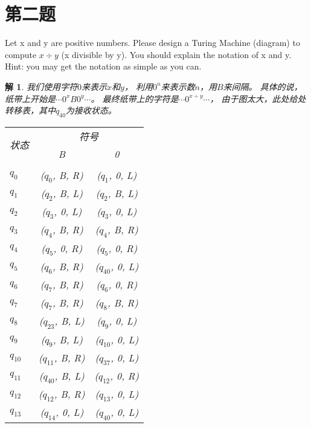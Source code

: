 \documentclass[12pt,onecolumn]{article}
\theoremstyle{plain}
\newtheorem*{solution}{解}
\begin{document}
\section{第二题}
Let x and y are positive numbers.
Please design a Turing Machine (diagram) to compute $x \div y$ (x divisible by y).
You should explain the notation of x and y.
Hint: you may get the notation as simple as you can.

\begin{solution}
 我们使用字符$0$来表示$x$和$y$，
 利用$0^n$来表示数$n$，用$B$来间隔。
 具体的说，
 纸带上开始是$\cdots 0^x B 0^y \cdots$。
 最终纸带上的字符是$\cdots 0^{x \div y} \cdots$，
 由于图太大，此处给处转移表，其中$q_{40}$为接收状态。
 \begin{table}[H]
 \vspace{0.5em}\centering\wuhao{}
 \begin{tabular}{l|cc}
 \multirow{2}{*}{状态}
 & \multicolumn{2}{c}{符号}                    \\
 ~        & B                        & 0                \\
 \toprule                                               \\
 $q_{0}$  & ($q_{0}$, B, R)          & ($q_{1}$, 0, L)  \\
 $q_{1}$  & ($q_{2}$, B, L)          & ($q_{2}$, B, L)  \\
 $q_{2}$  & ($q_{3}$, 0, L)          & ($q_{3}$, 0, L)  \\
 $q_{3}$  & ($q_{4}$, B, R)          & ($q_{4}$, B, R)  \\
 $q_{4}$  & ($q_{5}$, 0, R)          & ($q_{5}$, 0, R)  \\
 $q_{5}$  & ($q_{6}$, B, R)          & ($q_{40}$, 0, L) \\
 $q_{6}$  & ($q_{7}$, B, R)          & ($q_{6}$, 0, R)  \\
 $q_{7}$  & ($q_{7}$, B, R)          & ($q_{8}$, B, R)  \\
 $q_{8}$  & ($q_{23}$, B, L)         & ($q_{9}$, 0, L)  \\
 $q_{9}$  & ($q_{9}$, B, L)          & ($q_{10}$, 0, L) \\
 $q_{10}$ & ($q_{11}$, B, R)         & ($q_{37}$, 0, L) \\
 $q_{11}$ & ($q_{40}$, B, L)         & ($q_{12}$, 0, R) \\
 $q_{12}$ & ($q_{12}$, B, R)         & ($q_{13}$, 0, L) \\
 $q_{13}$ & ($q_{14}$, 0, L)         & ($q_{40}$, 0, L) \\

\end{tabular}
\end{table}
\end{solution}
\end{document}
